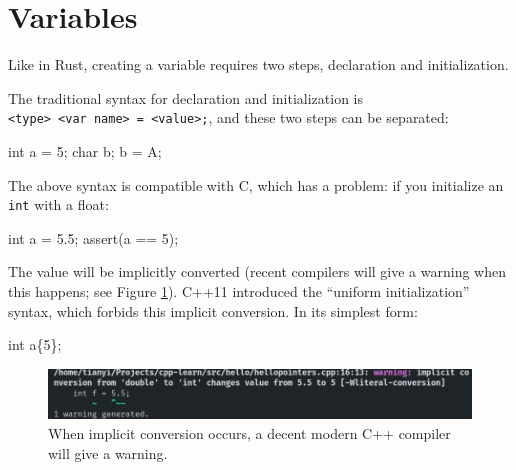 \documentclass[
]{book}
\newenvironment{Shaded}{\begin{snugshade}}{\end{snugshade}}
\newcommand{\CharTok}[1]{\textcolor[rgb]{0.31,0.60,0.02}{#1}}
\newcommand{\DataTypeTok}[1]{\textcolor[rgb]{0.13,0.29,0.53}{#1}}
\newcommand{\DecValTok}[1]{\textcolor[rgb]{0.00,0.00,0.81}{#1}}
\newcommand{\FloatTok}[1]{\textcolor[rgb]{0.00,0.00,0.81}{#1}}
\newcommand{\NormalTok}[1]{#1}
\newcommand{\OtherTok}[1]{\textcolor[rgb]{0.56,0.35,0.01}{#1}}
\begin{document}
\hypertarget{variables}{%
\section{Variables}\label{variables}}

Like in Rust, creating a variable requires two steps, declaration and initialization.

The traditional syntax for declaration and initialization is \texttt{\textless{}type\textgreater{}\ \textless{}var\ name\textgreater{}\ =\ \textless{}value\textgreater{};},
and these two steps can be separated:

\begin{Shaded}
\begin{Highlighting}[]
\DataTypeTok{int}\NormalTok{ a = }\DecValTok{5}\NormalTok{;}
\DataTypeTok{char}\NormalTok{ b;}
\NormalTok{b = }\CharTok{\textquotesingle{}A\textquotesingle{}}\NormalTok{;}
\end{Highlighting}
\end{Shaded}

The above syntax is compatible with C, which has a problem: if you initialize an \texttt{int} with a float:

\begin{Shaded}
\begin{Highlighting}[]
\DataTypeTok{int}\NormalTok{ a = }\FloatTok{5.5}\NormalTok{;}
\OtherTok{assert}\NormalTok{(a == }\DecValTok{5}\NormalTok{);}
\end{Highlighting}
\end{Shaded}

The value will be implicitly converted (recent compilers will give a warning when this happens; see Figure \ref{fig:equal}).
C++11 introduced the ``uniform initialization'' syntax, which forbids this implicit conversion. In its simplest form:

\begin{Shaded}
\begin{Highlighting}[]
\DataTypeTok{int}\NormalTok{ a\{}\DecValTok{5}\NormalTok{\};}
\end{Highlighting}
\end{Shaded}

\begin{figure}
\centering
\includegraphics{img/equal.png}
\caption{\label{fig:equal}When implicit conversion occurs, a decent modern C++ compiler will give a warning.}
\end{figure}
\end{document}
